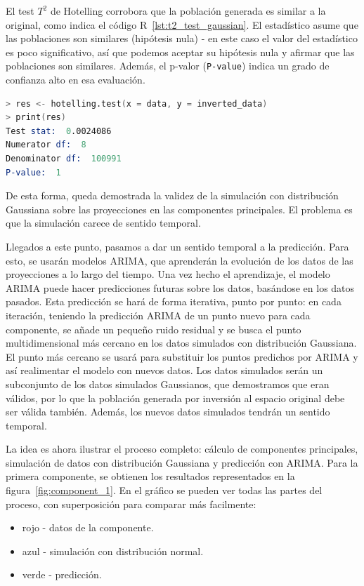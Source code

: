 \documentclass[11pt,spanish,listoffigures,listoftables]{tfgetsinf}
\begin{document}
    El test \(T^2\) de Hotelling corrobora que la población generada es similar a la original, como indica el código R~\ref{lst:t2_test_gaussian}. El estadístico asume que las poblaciones son similares (hipótesis nula) - en este caso el valor del estadístico es poco significativo, así que podemos aceptar su hipótesis nula y afirmar que las poblaciones son similares. Además, el p-valor ({\tt P-value}) indica un grado de confianza alto en esa evaluación.
    
    \begin{lstlisting}[language=S, caption=Test \(T^2\) de Hotelling en R., label={lst:t2_test_gaussian}]
> res <- hotelling.test(x = data, y = inverted_data)
> print(res)
Test stat:  0.0024086 
Numerator df:  8 
Denominator df:  100991 
P-value:  1
    \end{lstlisting}
    
    De esta forma, queda demostrada la validez de la simulación con distribución Gaussiana sobre las proyecciones en las componentes principales. El problema es que la simulación carece de sentido temporal.
        
    Llegados a este punto, pasamos a dar un sentido temporal a la predicción. Para esto, se usarán modelos ARIMA, que aprenderán la evolución de los datos de las proyecciones a lo largo del tiempo. Una vez hecho el aprendizaje, el modelo ARIMA puede hacer predicciones futuras sobre los datos, basándose en los datos pasados. Esta predicción se hará de forma iterativa, punto por punto: en cada iteración, teniendo la predicción ARIMA de un punto nuevo para cada componente, se añade un pequeño ruido residual y se busca el punto multidimensional más cercano en los datos simulados con distribución Gaussiana. El punto más cercano se usará para substituir los puntos predichos por ARIMA y así realimentar el modelo con nuevos datos. Los datos simulados serán un subconjunto de los datos simulados Gaussianos, que demostramos que eran válidos, por lo que la población generada por inversión al espacio original debe ser válida también. Además, los nuevos datos simulados tendrán un sentido temporal.
    
    La idea es ahora ilustrar el proceso completo: cálculo de componentes principales, simulación de datos con distribución Gaussiana y predicción con ARIMA. Para la primera componente, se obtienen los resultados representados en la figura~\ref{fig:component_1}. En el gráfico se pueden ver todas las partes del proceso, con superposición para comparar más facilmente:
    \begin{itemize}
        \item rojo - datos de la componente.
        \item azul - simulación con distribución normal.
        \item verde - predicción.
    \end{itemize}
    
\end{document}
